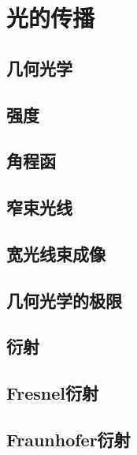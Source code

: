 \chapter{光的传播}

\section{几何光学}

\section{强度}

\section{角程函}

\section{窄束光线}

\section{宽光线束成像}

\section{几何光学的极限}

\section{衍射}

\section{Fresnel衍射}

\section{Fraunhofer衍射}